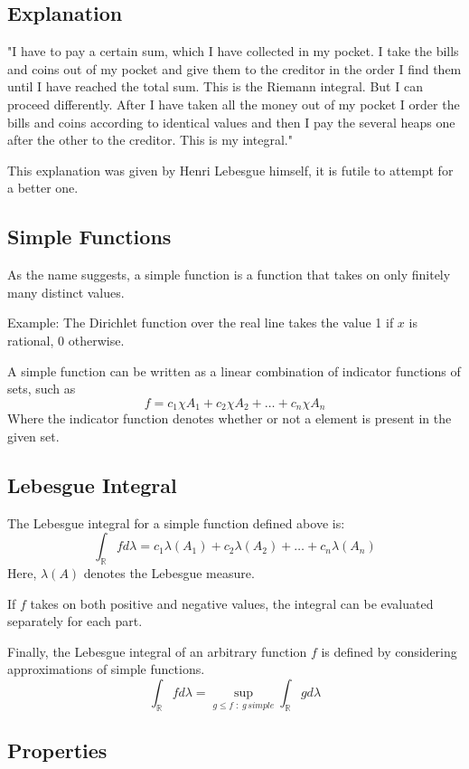 \documentclass{article}
\begin{document}
\subsection{Explanation}

\begin{center}
    "I have to pay a certain sum, which I have collected in my pocket. I take the bills and coins out of my pocket and give them to the creditor in the order I find them until I have reached the total sum. This is the Riemann integral. But I can proceed differently. After I have taken all the money out of my pocket I order the bills and coins according to identical values and then I pay the several heaps one after the other to the creditor. This is my integral."
\end{center}

This explanation was given by Henri Lebesgue himself, it is futile to attempt for a better one.

\subsection{Simple Functions}
As the name suggests, a simple function is a function that takes on only finitely many distinct values. 

Example: The Dirichlet function over the real line takes the value 1 if $x$ is rational, 0 otherwise.

A simple function can be written as a linear combination of indicator functions of sets, such as
$$f = c_1\chi A_1 +c_2\chi A_2+\dots+c_n\chi A_n$$
Where the indicator function denotes whether or not a element is present in the given set.

\subsection{Lebesgue Integral}
The Lebesgue integral for a simple function defined above is:
$$ \int_{\mathbb{R}} fd{\lambda}=c_1\lambda (A_1)+c_2\lambda (A_2)+\dots+c_n\lambda (A_n)$$
Here, $\lambda(A)$ denotes the Lebesgue measure.

If $f$ takes on both positive and negative values, the integral can be evaluated separately for each part.

Finally, the Lebesgue integral of an arbitrary function $f$ is defined by considering approximations of simple functions.
\[ \int_{\mathbb{R}} fd{\lambda}= \sup\limits_{g \leq f \;:\; g \,simple} \int_{\mathbb{R}} gd{\lambda}\]

\subsection{Properties}
\end{document}
